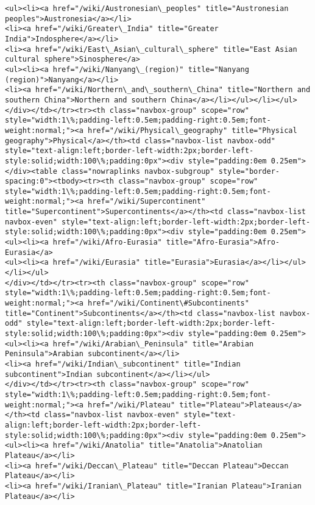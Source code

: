 \documentclass[11pt]{article}
\begin{document}
\begin{Verbatim}[commandchars=\\\{\}]
<ul><li><a href="/wiki/Austronesian\_peoples" title="Austronesian peoples">Austronesia</a></li>
<li><a href="/wiki/Greater\_India" title="Greater India">Indosphere</a></li>
<li><a href="/wiki/East\_Asian\_cultural\_sphere" title="East Asian cultural sphere">Sinosphere</a>
<ul><li><a href="/wiki/Nanyang\_(region)" title="Nanyang (region)">Nanyang</a></li>
<li><a href="/wiki/Northern\_and\_southern\_China" title="Northern and southern China">Northern and southern China</a></li></ul></li></ul>
</div></td></tr><tr><th class="navbox-group" scope="row" style="width:1\%;padding-left:0.5em;padding-right:0.5em;font-weight:normal;"><a href="/wiki/Physical\_geography" title="Physical geography">Physical</a></th><td class="navbox-list navbox-odd" style="text-align:left;border-left-width:2px;border-left-style:solid;width:100\%;padding:0px"><div style="padding:0em 0.25em"></div><table class="nowraplinks navbox-subgroup" style="border-spacing:0"><tbody><tr><th class="navbox-group" scope="row" style="width:1\%;padding-left:0.5em;padding-right:0.5em;font-weight:normal;"><a href="/wiki/Supercontinent" title="Supercontinent">Supercontinents</a></th><td class="navbox-list navbox-even" style="text-align:left;border-left-width:2px;border-left-style:solid;width:100\%;padding:0px"><div style="padding:0em 0.25em">
<ul><li><a href="/wiki/Afro-Eurasia" title="Afro-Eurasia">Afro-Eurasia</a>
<ul><li><a href="/wiki/Eurasia" title="Eurasia">Eurasia</a></li></ul></li></ul>
</div></td></tr><tr><th class="navbox-group" scope="row" style="width:1\%;padding-left:0.5em;padding-right:0.5em;font-weight:normal;"><a href="/wiki/Continent\#Subcontinents" title="Continent">Subcontinents</a></th><td class="navbox-list navbox-odd" style="text-align:left;border-left-width:2px;border-left-style:solid;width:100\%;padding:0px"><div style="padding:0em 0.25em">
<ul><li><a href="/wiki/Arabian\_Peninsula" title="Arabian Peninsula">Arabian subcontinent</a></li>
<li><a href="/wiki/Indian\_subcontinent" title="Indian subcontinent">Indian subcontinent</a></li></ul>
</div></td></tr><tr><th class="navbox-group" scope="row" style="width:1\%;padding-left:0.5em;padding-right:0.5em;font-weight:normal;"><a href="/wiki/Plateau" title="Plateau">Plateaus</a></th><td class="navbox-list navbox-even" style="text-align:left;border-left-width:2px;border-left-style:solid;width:100\%;padding:0px"><div style="padding:0em 0.25em">
<ul><li><a href="/wiki/Anatolia" title="Anatolia">Anatolian Plateau</a></li>
<li><a href="/wiki/Deccan\_Plateau" title="Deccan Plateau">Deccan Plateau</a></li>
<li><a href="/wiki/Iranian\_Plateau" title="Iranian Plateau">Iranian Plateau</a></li>

\end{Verbatim}
\end{document}
